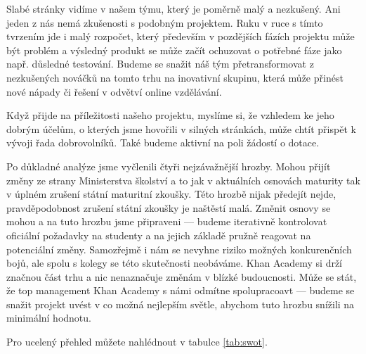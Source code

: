 \documentclass[12pt, a4paper]{report}
\begin{document}
Slabé stránky vidíme v našem týmu, který je poměrně malý a nezkušený. Ani jeden z nás nemá zkušenosti s podobným projektem. Ruku v ruce s tímto tvrzením jde i malý rozpočet, který především v pozdějších fázích projektu může být problém a výsledný produkt se může začít ochuzovat o potřebné fáze jako např. důsledné testování. Budeme se snažit náš tým přetransformovat z nezkušených nováčků na tomto trhu na inovativní skupinu, která může přinést nové nápady či řešení v odvětví online vzdělávání.

Když přijde na příležitosti našeho projektu, myslíme si, že vzhledem ke jeho dobrým účelům, o kterých jsme hovořili v silných stránkách, může chtít přispět k vývoji řada dobrovolníků. Také budeme aktivní na poli žádostí o dotace. 

Po důkladné analýze jsme vyčlenili čtyři nejzávažnější hrozby. Mohou přijít změny ze strany Ministerstva školství a to jak v aktuálních osnovách maturity tak v úplném zrušení státní maturitní zkoušky. Této hrozbě nijak předejít nejde, pravděpodobnost zrušení státní zkoušky je naštěstí malá. Změnit osnovy se mohou a na tuto hrozbu jsme připraveni --- budeme iterativně kontrolovat oficiální požadavky na studenty a na jejich základě pružně reagovat na potenciální změny. Samozřejmě i nám se nevyhne riziko možných konkurenčních bojů, ale spolu s kolegy se této skutečnosti neobáváme. Khan Academy si drží značnou část trhu a nic nenaznačuje změnám v blízké budoucnosti. Může se stát, že top management Khan Academy s námi odmítne spolupracoavt --- budeme se snažit projekt uvést v co možná nejlepším světle, abychom tuto hrozbu snížili na minimální hodnotu.

Pro ucelený přehled můžete nahlédnout v tabulce \ref{tab:swot}.
\end{document}
